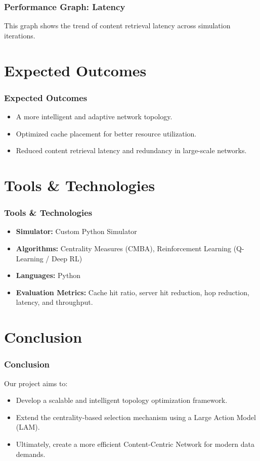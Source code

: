 \documentclass{beamer}
\begin{document}
\begin{frame}
  \frametitle{Performance Graph: Latency}
  \justify
  This graph shows the trend of content retrieval latency across simulation iterations.


\end{frame}

\section{Expected Outcomes}
\begin{frame}
  \frametitle{Expected Outcomes}
  \begin{itemize}
    \item A more intelligent and adaptive network topology.
    \item Optimized cache placement for better resource utilization.
    \item Reduced content retrieval latency and redundancy in large-scale networks.
  \end{itemize}
\end{frame}

\section{Tools \& Technologies}
\begin{frame}
  \frametitle{Tools \& Technologies}
    \begin{itemize}
        \item \textbf{Simulator:} Custom Python Simulator
        \item \textbf{Algorithms:} Centrality Measures (CMBA), Reinforcement Learning (Q-Learning / Deep RL)
        \item \textbf{Languages:} Python
        \item \textbf{Evaluation Metrics:} Cache hit ratio, server hit reduction, hop reduction, latency, and throughput.
    \end{itemize}
\end{frame}

\section{Conclusion}
\begin{frame}
  \frametitle{Conclusion}
  Our project aims to:
  \begin{itemize}
    \item Develop a scalable and intelligent topology optimization framework.
    \item Extend the centrality-based selection mechanism using a Large Action Model (LAM).
    \item Ultimately, create a more efficient Content-Centric Network for modern data demands.
  \end{itemize}
\end{frame}
\end{document}
